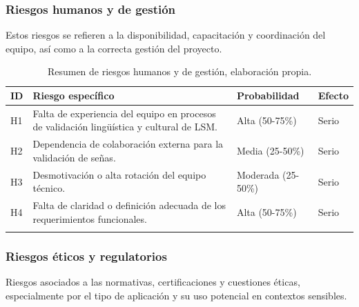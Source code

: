 \subsubsection{Riesgos humanos y de gestión}
Estos riesgos se refieren a la disponibilidad, capacitación y coordinación del equipo, así como a la correcta gestión del proyecto.

\setlength{\tabcolsep}{4pt}
\renewcommand{\arraystretch}{1.2}

\begin{longtable}{|>{\centering\arraybackslash}p{0.8cm}|>{\raggedright\arraybackslash}p{3.5cm}|>{\raggedright\arraybackslash}p{5.1cm}|>{\raggedright\arraybackslash}p{5.1cm}|}
	\hline
	\textbf{ID} & \textbf{Riesgo específico} & \textbf{Probabilidad} & \textbf{Efecto} \\
	\hline
	H1 & Falta de experiencia del equipo en procesos de validación lingüística y cultural de LSM. & Alta (50-75\%) & Serio \\
	\hline
	H2 & Dependencia de colaboración externa para la validación de señas. & Media (25-50\%) & Serio \\
	\hline
	H3 & Desmotivación o alta rotación del equipo técnico. & Moderada (25-50\%) & Serio \\
	\hline
	H4 & Falta de claridad o definición adecuada de los requerimientos funcionales. & Alta (50-75\%) & Serio \\
	\hline
\caption[Resumen de riesgos humanos y de gestión]{Resumen de riesgos humanos y de gestión, elaboración propia.} \label{tab:riesgos_humanoss_resumen} \\
\end{longtable}

\newpage
\subsubsection{Riesgos éticos y regulatorios}
Riesgos asociados a las normativas, certificaciones y cuestiones éticas, especialmente por el tipo de aplicación y su uso potencial en contextos sensibles.

\setlength{\tabcolsep}{4pt}
\renewcommand{\arraystretch}{1.2}


